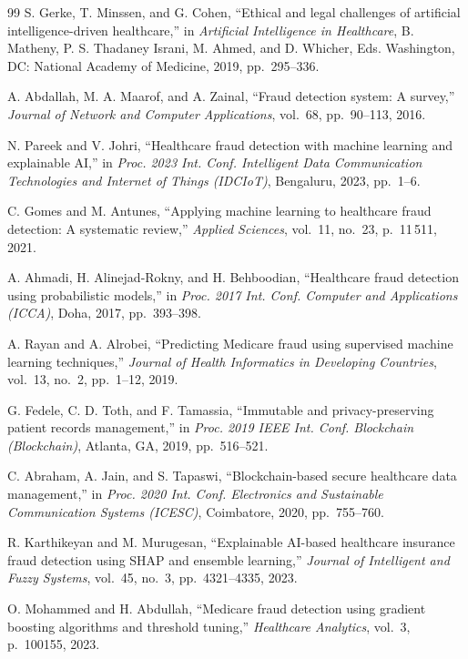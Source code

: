 \begin{thebibliography}{99}
S. Gerke, T. Minssen, and G. Cohen,
``Ethical and legal challenges of artificial intelligence-driven healthcare,''
in \textit{Artificial Intelligence in Healthcare},
B. Matheny, P. S. Thadaney Israni, M. Ahmed, and D. Whicher, Eds.
Washington, DC: National Academy of Medicine, 2019, pp.~295--336.

A. Abdallah, M. A. Maarof, and A. Zainal,
``Fraud detection system: A survey,''
\textit{Journal of Network and Computer Applications},
vol.~68, pp.~90--113, 2016.

N. Pareek and V. Johri,
``Healthcare fraud detection with machine learning and explainable AI,''
in \textit{Proc. 2023 Int. Conf. Intelligent Data Communication Technologies and Internet of Things (IDCIoT)},
Bengaluru, 2023, pp.~1--6.

C. Gomes and M. Antunes,
``Applying machine learning to healthcare fraud detection: A systematic review,''
\textit{Applied Sciences},
vol.~11, no.~23, p.~11\,511, 2021.

A. Ahmadi, H. Alinejad-Rokny, and H. Behboodian,
``Healthcare fraud detection using probabilistic models,''
in \textit{Proc. 2017 Int. Conf. Computer and Applications (ICCA)},
Doha, 2017, pp.~393--398.

A. Rayan and A. Alrobei,
``Predicting Medicare fraud using supervised machine learning techniques,''
\textit{Journal of Health Informatics in Developing Countries},
vol.~13, no.~2, pp.~1--12, 2019.

G. Fedele, C. D. Toth, and F. Tamassia,
``Immutable and privacy-preserving patient records management,''
in \textit{Proc. 2019 IEEE Int. Conf. Blockchain (Blockchain)},
Atlanta, GA, 2019, pp.~516--521.

C. Abraham, A. Jain, and S. Tapaswi,
``Blockchain-based secure healthcare data management,''
in \textit{Proc. 2020 Int. Conf. Electronics and Sustainable Communication Systems (ICESC)},
Coimbatore, 2020, pp.~755--760.

R. Karthikeyan and M. Murugesan,
``Explainable AI-based healthcare insurance fraud detection using SHAP and ensemble learning,''
\textit{Journal of Intelligent and Fuzzy Systems},
vol.~45, no.~3, pp.~4321--4335, 2023.

O. Mohammed and H. Abdullah,
``Medicare fraud detection using gradient boosting algorithms and threshold tuning,''
\textit{Healthcare Analytics},
vol.~3, p.~100155, 2023.


\end{thebibliography}
